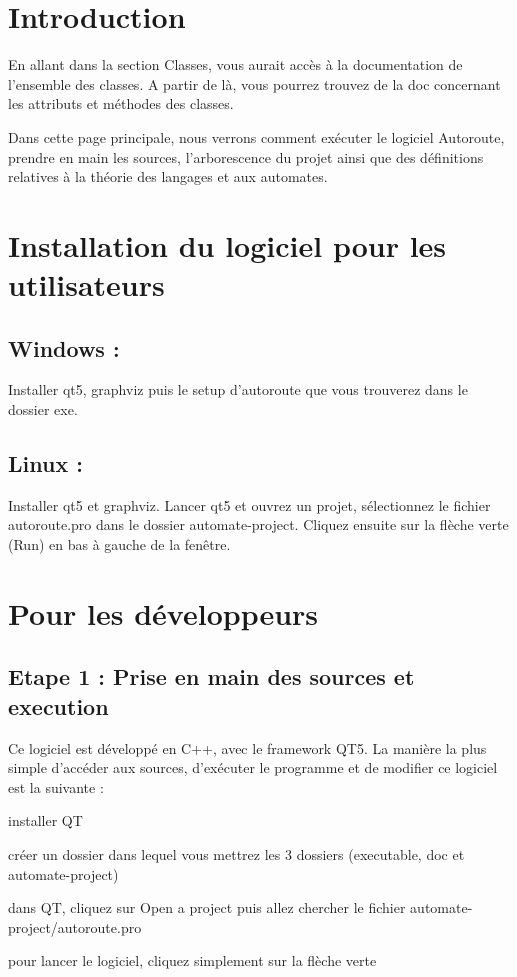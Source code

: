 \hypertarget{index_intro_sec}{}\section{Introduction}\label{index_intro_sec}
En allant dans la section Classes, vous aurait accès à la documentation de l'ensemble des classes. A partir de là, vous pourrez trouvez de la doc concernant les attributs et méthodes des classes.

Dans cette page principale, nous verrons comment exécuter le logiciel Autoroute, prendre en main les sources, l'arborescence du projet ainsi que des définitions relatives à la théorie des langages et aux automates.\hypertarget{index_install_sec}{}\section{Installation du logiciel pour les utilisateurs}\label{index_install_sec}
\hypertarget{index_windows}{}\subsection{Windows \-:}\label{index_windows}
Installer qt5, graphviz puis le setup d'autoroute que vous trouverez dans le dossier exe.\hypertarget{index_linux}{}\subsection{Linux \-:}\label{index_linux}
Installer qt5 et graphviz. Lancer qt5 et ouvrez un projet, sélectionnez le fichier autoroute.\-pro dans le dossier automate-\/project. Cliquez ensuite sur la flèche verte (Run) en bas à gauche de la fenêtre.\hypertarget{index_dev_sec}{}\section{Pour les développeurs}\label{index_dev_sec}
\hypertarget{index_etape1}{}\subsection{Etape 1 \-: Prise en main des sources et execution}\label{index_etape1}
Ce logiciel est développé en C++, avec le framework Q\-T5. La manière la plus simple d'accéder aux sources, d'exécuter le programme et de modifier ce logiciel est la suivante \-:
\begin{DoxyItemize}
\item installer Q\-T
\item créer un dossier dans lequel vous mettrez les 3 dossiers (executable, doc et automate-\/project)
\item dans Q\-T, cliquez sur Open a project puis allez chercher le fichier automate-\/project/autoroute.\-pro
\item pour lancer le logiciel, cliquez simplement sur la flèche verte
\end{DoxyItemize}

